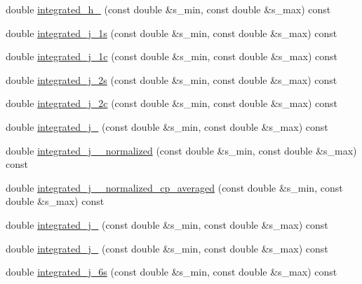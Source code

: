 \begin{DoxyCompactItemize}
\item 
double \hyperlink{classeos_1_1BToKstarDilepton_3_01LargeRecoil_01_4_a3b8088372d3a79556a70c874d7bff834}{integrated\_\-h\_} (const double \&s\_\-min, const double \&s\_\-max) const 
\item 
double \hyperlink{classeos_1_1BToKstarDilepton_3_01LargeRecoil_01_4_ab85914d06df8417561d93992ac831d5a}{integrated\_\-j\_\-1s} (const double \&s\_\-min, const double \&s\_\-max) const 
\item 
double \hyperlink{classeos_1_1BToKstarDilepton_3_01LargeRecoil_01_4_acecdd3061211d3b737cb7ddd3cfb0a27}{integrated\_\-j\_\-1c} (const double \&s\_\-min, const double \&s\_\-max) const 
\item 
double \hyperlink{classeos_1_1BToKstarDilepton_3_01LargeRecoil_01_4_ac9392ba39e14592b310c6dbfa39c51dc}{integrated\_\-j\_\-2s} (const double \&s\_\-min, const double \&s\_\-max) const 
\item 
double \hyperlink{classeos_1_1BToKstarDilepton_3_01LargeRecoil_01_4_a3384404d2fb165a76421d1e3d5814bf2}{integrated\_\-j\_\-2c} (const double \&s\_\-min, const double \&s\_\-max) const 
\item 
double \hyperlink{classeos_1_1BToKstarDilepton_3_01LargeRecoil_01_4_a55d2a76ae67afb9a549aea69b76af846}{integrated\_\-j\_} (const double \&s\_\-min, const double \&s\_\-max) const 
\item 
double \hyperlink{classeos_1_1BToKstarDilepton_3_01LargeRecoil_01_4_af61c16f0cb7147d9cb8fbde1aa494c41}{integrated\_\-j\_\_\-normalized} (const double \&s\_\-min, const double \&s\_\-max) const 
\item 
double \hyperlink{classeos_1_1BToKstarDilepton_3_01LargeRecoil_01_4_a68617d15999d9b87a9f3105ccc7c0d92}{integrated\_\-j\_\_\-normalized\_\-cp\_\-averaged} (const double \&s\_\-min, const double \&s\_\-max) const 
\item 
double \hyperlink{classeos_1_1BToKstarDilepton_3_01LargeRecoil_01_4_ad1b9d4ed45d58d3ba4ee5b53d4e4657f}{integrated\_\-j\_} (const double \&s\_\-min, const double \&s\_\-max) const 
\item 
double \hyperlink{classeos_1_1BToKstarDilepton_3_01LargeRecoil_01_4_a713b072eac8610b7aadfdd1250608f91}{integrated\_\-j\_} (const double \&s\_\-min, const double \&s\_\-max) const 
\item 
double \hyperlink{classeos_1_1BToKstarDilepton_3_01LargeRecoil_01_4_ab93356611a370d9035a54a4a93797dac}{integrated\_\-j\_\-6s} (const double \&s\_\-min, const double \&s\_\-max) const 
\item 

\end{DoxyCompactItemize}
